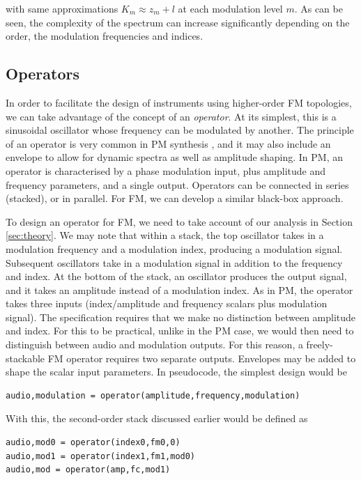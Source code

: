 \documentclass[]{interact}
\begin{document}
\noindent with same approximations $K_m \approx z_m + l$ at each modulation level $m$. As can be seen, the complexity of the spectrum can increase significantly depending on the order, the modulation frequencies and indices.

\subsection{Operators}

In order to facilitate the design of instruments using higher-order FM topologies, we
can take advantage of the concept of an \emph{operator}. At its simplest, this is a sinusoidal
oscillator whose frequency can be modulated by another. The principle of an operator is very 
common in PM synthesis \citep{FMTheory}, and it may also include an envelope to 
allow for dynamic spectra as well as amplitude shaping. In PM, an operator is characterised
by a phase modulation input, plus amplitude and frequency parameters, and a single output. Operators 
can be connected in series (stacked), or in parallel. For FM, we can develop a similar black-box 
approach.

To design an operator for FM, we need to take account of our analysis in 
Section \ref{sec:theory}. We may note that within a stack, the top oscillator takes in
a modulation frequency and a modulation index, producing a modulation signal. Subsequent
oscillators take in a modulation signal in addition to the frequency and index. At the bottom of 
the stack, an oscillator produces the output signal, and it takes an amplitude instead of a modulation 
index. As in PM, the operator takes three inputs (index/amplitude and frequency scalars 
plus modulation signal). The specification requires that we make no distinction between amplitude
and index. For this to be practical, unlike in the PM case, we would then need to distinguish between 
audio and modulation outputs. For this reason, a freely-stackable FM operator requires 
two separate outputs. Envelopes may be added to shape the scalar input parameters. In pseudocode, 
the simplest design would be

\begin{lstlisting}
audio,modulation = operator(amplitude,frequency,modulation)
\end{lstlisting}

With this, the second-order stack discussed earlier would be defined as

\begin{lstlisting}
audio,mod0 = operator(index0,fm0,0)
audio,mod1 = operator(index1,fm1,mod0)
audio,mod = operator(amp,fc,mod1)
\end{lstlisting}
\end{document}
